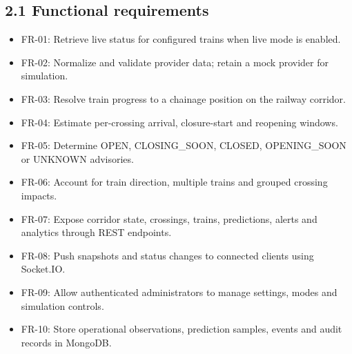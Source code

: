 \documentclass[12pt,a4paper]{report}
\begin{document}
\subsection{2.1 Functional requirements}
\begin{itemize}\item FR-01: Retrieve live status for configured trains when live mode is enabled.\end{itemize}
\begin{itemize}\item FR-02: Normalize and validate provider data; retain a mock provider for simulation.\end{itemize}
\begin{itemize}\item FR-03: Resolve train progress to a chainage position on the railway corridor.\end{itemize}
\begin{itemize}\item FR-04: Estimate per-crossing arrival, closure-start and reopening windows.\end{itemize}
\begin{itemize}\item FR-05: Determine OPEN, CLOSING\_SOON, CLOSED, OPENING\_SOON or UNKNOWN advisories.\end{itemize}
\begin{itemize}\item FR-06: Account for train direction, multiple trains and grouped crossing impacts.\end{itemize}
\begin{itemize}\item FR-07: Expose corridor state, crossings, trains, predictions, alerts and analytics through REST endpoints.\end{itemize}
\begin{itemize}\item FR-08: Push snapshots and status changes to connected clients using Socket.IO.\end{itemize}
\begin{itemize}\item FR-09: Allow authenticated administrators to manage settings, modes and simulation controls.\end{itemize}
\begin{itemize}\item FR-10: Store operational observations, prediction samples, events and audit records in MongoDB.\end{itemize}
\end{document}
